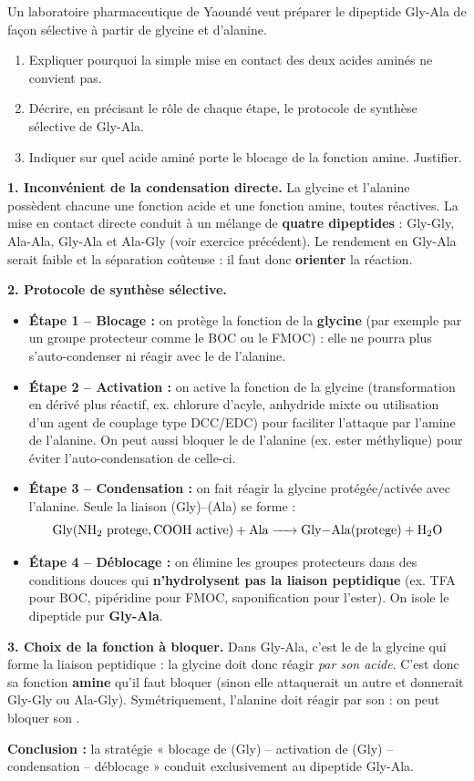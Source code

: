 \documentclass[11pt]{article}
\begin{document}
\begin{exoresolu}
Un laboratoire pharmaceutique de Yaoundé veut préparer le dipeptide Gly-Ala de façon sélective à partir de glycine et d'alanine.
\begin{enumerate}
\item Expliquer pourquoi la simple mise en contact des deux acides aminés ne convient pas.
\item Décrire, en précisant le rôle de chaque étape, le protocole de synthèse sélective de Gly-Ala.
\item Indiquer sur quel acide aminé porte le blocage de la fonction amine. Justifier.
\end{enumerate}
\tcblower
\textbf{1. Inconvénient de la condensation directe.} La glycine et l'alanine possèdent chacune une fonction acide et une fonction amine, toutes réactives. La mise en contact directe conduit à un mélange de \textbf{quatre dipeptides} : Gly-Gly, Ala-Ala, Gly-Ala et Ala-Gly (voir exercice précédent). Le rendement en Gly-Ala serait faible et la séparation coûteuse : il faut donc \textbf{orienter} la réaction.

\textbf{2. Protocole de synthèse sélective.}
\begin{itemize}
\item \textbf{Étape 1 -- Blocage :} on protège la fonction  de la \textbf{glycine} (par exemple par un groupe protecteur comme le BOC ou le FMOC) : elle ne pourra plus s'auto-condenser ni réagir avec le  de l'alanine.
\item \textbf{Étape 2 -- Activation :} on active la fonction  de la glycine (transformation en dérivé plus réactif, ex. chlorure d'acyle, anhydride mixte ou utilisation d'un agent de couplage type DCC/EDC) pour faciliter l'attaque par l'amine de l'alanine. On peut aussi bloquer le  de l'alanine (ex. ester méthylique) pour éviter l'auto-condensation de celle-ci.
\item \textbf{Étape 3 -- Condensation :} on fait réagir la glycine protégée/activée avec l'alanine. Seule la liaison (Gly)--(Ala) se forme :
\[ \ce{Gly(NH2\ protege, COOH\ active) + Ala -> Gly-Ala(protege) + H2O} \]
\item \textbf{Étape 4 -- Déblocage :} on élimine les groupes protecteurs dans des conditions douces qui \textbf{n'hydrolysent pas la liaison peptidique} (ex. TFA pour BOC, pipéridine pour FMOC, saponification pour l'ester). On isole le dipeptide pur \textbf{Gly-Ala}.
\end{itemize}

\textbf{3. Choix de la fonction à bloquer.} Dans Gly-Ala, c'est le  de la glycine qui forme la liaison peptidique : la glycine doit donc réagir \emph{par son acide}. C'est donc sa fonction \textbf{amine} qu'il faut bloquer (sinon elle attaquerait un autre  et donnerait Gly-Gly ou Ala-Gly). Symétriquement, l'alanine doit réagir par son  : on peut bloquer son .

\textbf{Conclusion :} la stratégie « blocage de (Gly) -- activation de (Gly) -- condensation -- déblocage » conduit exclusivement au dipeptide Gly-Ala.
\end{exoresolu}
\end{document}
